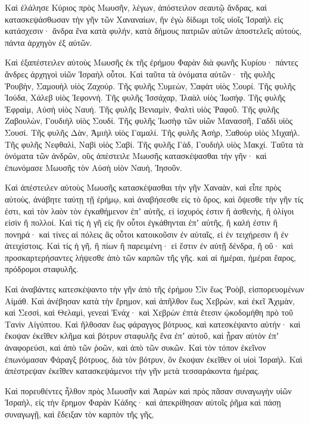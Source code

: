 {Καὶ ἐλάλησε Κύριος πρὸς Μωυσῆν, λέγων, ἀπόστειλον σεαυτῷ ἄνδρας,
καὶ κατασκεψάσθωσαν τὴν γῆν τῶν Χαναναίων, ἣν ἐγὼ δίδωμι τοῖς υἱοῖς Ἰσραὴλ εἰς κατάσχεσιν· ἄνδρα ἕνα κατὰ φυλήν, κατὰ δήμους πατριῶν αὐτῶν ἀποστελεῖς αὐτοὺς, πάντα ἀρχηγὸν ἐξ αὐτῶν.
\par }{\PP {}Καὶ ἐξαπέστειλεν αὐτοὺς Μωυσῆς ἐκ τῆς ἐρήμου Φαρὰν διὰ φωνῆς Κυρίου· πάντες ἄνδρες ἀρχηγοὶ υἱῶν Ἰσραὴλ οὗτοι.
Καὶ ταῦτα τὰ ὀνόματα αὐτῶν· τῆς φυλῆς Ῥουβὴν, Σαμουὴλ υἱὸς Ζαχούρ.
Τῆς φυλῆς Συμεὼν, Σαφὰτ υἱὸς Σουρί.
Τῆς φυλῆς Ἰούδα, Χάλεβ υἱὸς Ἰεφοννή.
Τῆς φυλῆς Ἰσσάχαρ, Ἰλαὰλ υἱὸς Ἰωσήφ.
Τῆς φυλῆς Ἐφραὶμ, Αὐσὴ υἱὸς Ναυή.
Τῆς φυλῆς Βενιαμὶν, Φαλτὶ υἱὸς Ῥαφοῦ.
Τῆς φυλῆς Ζαβουλὼν, Γουδιὴλ υἱὸς Σουδί.
Τῆς φυλῆς Ἰωσὴφ τῶν υἱῶν Μανασσῆ, Γαδδὶ υἱὸς Σουσί.
Τῆς φυλῆς Δὰν, Ἀμιὴλ υἱὸς Γαμαλί.
Τῆς φυλῆς Ἀσὴρ, Σαθοὺρ υἱὸς Μιχαήλ.
Τῆς φυλῆς Νεφθαλὶ, Ναβὶ υἱὸς Σαβί.
Τῆς φυλῆς Γὰδ, Γουδιὴλ υἱὸς Μακχί.
Ταῦτα τὰ ὀνόματα τῶν ἀνδρῶν, οὓς ἀπέστειλε Μωυσῆς κατασκέψασθαι τὴν γῆν· καὶ ἐπωνόμασε Μωυσῆς τὸν Αὐσὴ υἱὸν Ναυὴ, Ἰησοῦν.
\par }{\PP {}Καὶ ἀπέστειλεν αὐτοὺς Μωυσῆς κατασκέψασθαι τὴν γῆν Χαναὰν, καὶ εἶπε πρὸς αὐτοὺς, ἀνάβητε ταύτῃ τῇ ἐρήμῳ, καὶ ἀναβήσεσθε εἰς τὸ ὄρος,
καὶ ὄψεσθε τὴν γῆν τίς ἐστι, καὶ τὸν λαὸν τὸν ἐγκαθήμενον ἐπʼ αὐτῆς, εἰ ἰσχυρός ἐστιν ἢ ἀσθενὴς, ἢ ὀλίγοι εἰσὶν ἢ πολλοί.
Καὶ τίς ἡ γῆ εἰς ἣν οὗτοι ἐγκάθηνται ἐπʼ αὐτῆς, ἢ καλή ἐστιν ἢ πονηρά· καὶ τίνες αἱ πόλεις ἃς οὗτοι κατοικοῦσιν ἐν αὐταῖς, εἰ ἐν τειχήρεσιν ἢ ἐν ἀτειχίστοις.
Καὶ τίς ἡ γῆ, ἢ πίων ἢ παρειμένη· εἰ ἔστιν ἐν αὐτῇ δένδρα, ἢ οὔ· καὶ προσκαρτερήσαντες λήψεσθε ἀπὸ τῶν καρπῶν τῆς γῆς. καὶ αἱ ἡμέραι, ἡμέραι ἔαρος, πρόδρομοι σταφυλῆς.
\par }{\PP {}Καὶ ἀναβάντες κατεσκέψαντο τὴν γῆν ἀπὸ τῆς ἐρήμου Σὶν ἕως Ῥοὸβ, εἰσπορευομένων Αἰμάθ.
Καὶ ἀνέβησαν κατὰ τὴν ἔρημον, καὶ ἀπῆλθον ἕως Χεβρὼν, καὶ ἐκεῖ Ἀχιμὰν, καὶ Σεσσὶ, καὶ Θελαμὶ, γενεαὶ Ἐνάχ· καὶ Χεβρὼν ἐπτὰ ἔτεσιν ᾠκοδομήθη πρὸ τοῦ Τανὶν Αἰγύπτου.
Καὶ ἤλθοσαν ἕως φάραγγος βότρυος, καὶ κατεσκέψαντο αὐτήν· καὶ ἔκοψαν ἐκεῖθεν κλῆμα καὶ βότρυν σταφυλῆς ἕνα ἐπʼ αὐτοῦ, καὶ ᾖραν αὐτὸν ἐπʼ ἀναφορεύσι, καὶ ἀπὸ τῶν ῥοῶν, καὶ ἀπὸ τῶν συκῶν.
Καὶ τὸν τόπον ἐκεῖνον ἐπωνόμασαν Φάραγξ βότρυος, διὰ τὸν βότρυν, ὃν ἔκοψαν ἐκεῖθεν οἱ υἱοὶ Ἰσραήλ.
Καὶ ἀπέστρεψαν ἐκεῖθεν κατασκεψάμενοι τὴν γῆν μετὰ τεσσαράκοντα ἡμέρας.
\par }{\PP {}Καὶ πορευθέντες ἦλθον πρὸς Μωυσῆν καὶ Ἀαρὼν καὶ πρὸς πᾶσαν συναγωγὴν υἱῶν Ἰσραὴλ, εἰς τὴν ἔρημον Φαρὰν Κάδης· καὶ ἀπεκρίθησαν αὐτοῖς ῥῆμα καὶ πάσῃ συναγωγῇ, καὶ ἔδειξαν τὸν καρπὸν τῆς γῆς,
}
